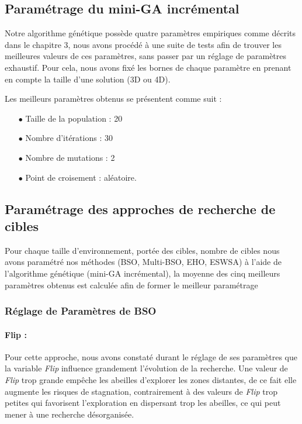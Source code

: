 	\subsection{Paramétrage du mini-GA incrémental}
	Notre algorithme génétique possède quatre paramètres empiriques comme décrits dans le chapitre 3, nous avons procédé à une suite de tests afin de trouver les meilleures valeurs de ces paramètres, sans passer par un réglage de paramètres exhaustif. 
	Pour cela, nous avons fixé les bornes de chaque paramètre en prenant en compte la taille d'une solution (3D ou 4D).
	
	Les meilleurs paramètres obtenus se présentent comme suit :
	\begin{itemize}
		\item [$\bullet$] Taille de la population : 20
		\item [$\bullet$] Nombre d'itérations : 30
		\item [$\bullet$] Nombre de mutations : 2
		\item [$\bullet$] Point de croisement : aléatoire.
	\end{itemize}
	
	\subsection{Paramétrage des approches de recherche de cibles}
	Pour chaque taille d'environnement, portée des cibles, nombre de cibles nous avons paramétré nos méthodes (BSO, Multi-BSO, EHO, ESWSA) à l'aide de l'algorithme génétique (mini-GA incrémental), la moyenne des cinq meilleurs paramètres obtenus est calculée afin de former le meilleur paramétrage
	
	\subsubsection{Réglage de Paramètres de BSO}
	\paragraph{Flip : } Pour cette approche, nous avons constaté durant le réglage de ses paramètres que la variable \textit{Flip} influence grandement l'évolution de la recherche. Une valeur de \textit{Flip} trop grande empêche les abeilles d'explorer les zones distantes, de ce fait elle augmente les risques de stagnation, contrairement à des valeurs de \textit{Flip} trop petites qui favorisent l'exploration en dispersant trop les abeilles, ce qui peut mener à une recherche désorganisée.
	
